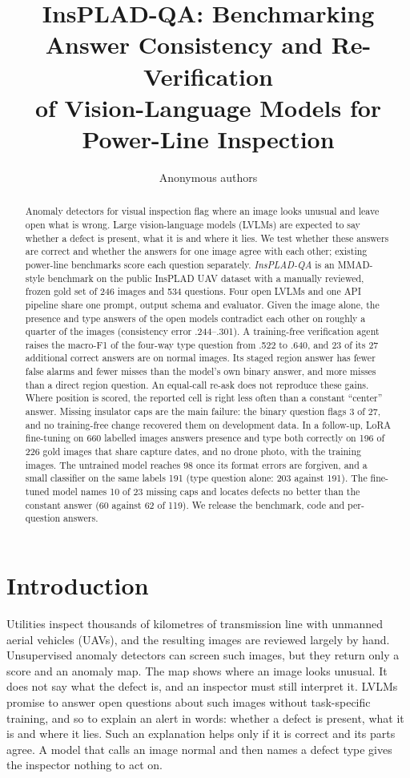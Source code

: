 \documentclass[11pt]{article}
\title{InsPLAD-QA: Benchmarking Answer Consistency and Re-Verification\\
of Vision-Language Models for Power-Line Inspection}
\author{Anonymous authors}
\date{}
\begin{document}
\maketitle

\begin{abstract}
Anomaly detectors for visual inspection flag where an image looks unusual and leave open what is wrong. Large vision-language models (LVLMs) are expected to say whether a defect is present, what it is and where it lies. We test whether these answers are correct and whether the answers for one image agree with each other; existing power-line benchmarks score each question separately. \emph{InsPLAD-QA} is an MMAD-style benchmark on the public InsPLAD UAV dataset with a manually reviewed, frozen gold set of 246 images and 534 questions. Four open LVLMs and one API pipeline share one prompt, output schema and evaluator. Given the image alone, the presence and type answers of the open models contradict each other on roughly a quarter of the images (consistency error .244--.301). A training-free verification agent raises the macro-F1 of the four-way type question from .522 to .640, and 23 of its 27 additional correct answers are on normal images. Its staged region answer has fewer false alarms and fewer misses than the model's own binary answer, and more misses than a direct region question. An equal-call re-ask does not reproduce these gains. Where position is scored, the reported cell is right less often than a constant ``center'' answer. Missing insulator caps are the main failure: the binary question flags 3 of 27, and no training-free change recovered them on development data. In a follow-up, LoRA fine-tuning on 660 labelled images answers presence and type both correctly on 196 of 226 gold images that share capture dates, and no drone photo, with the training images. The untrained model reaches 98 once its format errors are forgiven, and a small classifier on the same labels 191 (type question alone: 203 against 191). The fine-tuned model names 10 of 23 missing caps and locates defects no better than the constant answer (60 against 62 of 119). We release the benchmark, code and per-question answers.
\end{abstract}

\section{Introduction}
Utilities inspect thousands of kilometres of transmission line with unmanned aerial vehicles (UAVs), and the resulting images are reviewed largely by hand. Unsupervised anomaly detectors can screen such images, but they return only a score and an anomaly map. The map shows where an image looks unusual. It does not say what the defect is, and an inspector must still interpret it. LVLMs promise to answer open questions about such images without task-specific training, and so to explain an alert in words: whether a defect is present, what it is and where it lies. Such an explanation helps only if it is correct and its parts agree. A model that calls an image normal and then names a defect type gives the inspector nothing to act on.
\end{document}
